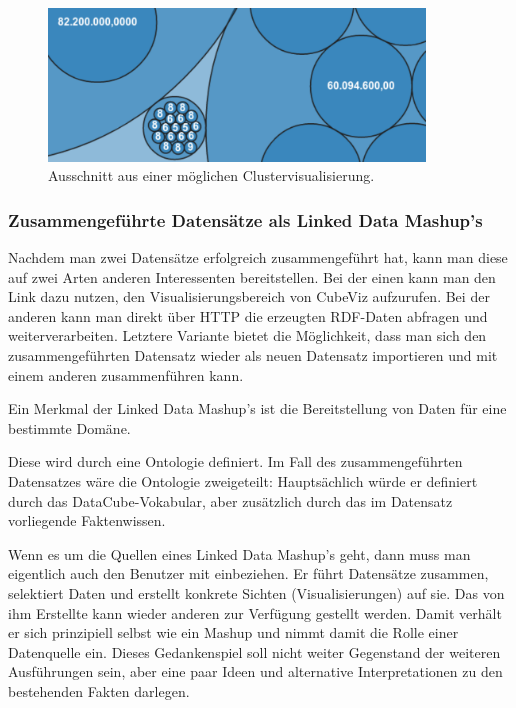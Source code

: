 \documentclass[11pt]{article}
\begin{document}
%
%
\begin{figure}[h!]
    \centering
    \includegraphics[width=10cm]{RefreshedUserInterfaces/ClusterVisualization.pdf}
    \caption{Ausschnitt aus einer möglichen Clustervisualisierung.}
    \label{fig:UserInterfaceMergeDatasets_ClusterVisualization}
\end{figure}


%
%
\subsubsection{Zusammengeführte Datensätze als Linked Data Mashup's}

Nachdem man zwei Datensätze erfolgreich zusammengeführt hat, kann man diese auf zwei Arten anderen Interessenten bereitstellen. Bei der einen kann man den Link dazu nutzen, den Visualisierungsbereich von CubeViz aufzurufen. Bei der anderen kann man direkt über HTTP die erzeugten RDF-Daten abfragen und weiterverarbeiten. Letztere Variante bietet die Möglichkeit, dass man sich den zusammengeführten Datensatz wieder als neuen Datensatz importieren und mit einem anderen zusammenführen kann.

Ein Merkmal der Linked Data Mashup's ist die Bereitstellung von Daten für eine bestimmte Domäne. 


\newpage
\noindent
Diese wird durch eine Ontologie definiert. Im Fall des zusammengeführten Datensatzes wäre die Ontologie zweigeteilt: Hauptsächlich würde er definiert durch das DataCube-Vokabular, aber zusätzlich durch das im Datensatz vorliegende Faktenwissen. 

Wenn es um die Quellen eines Linked Data Mashup's geht, dann muss man eigentlich auch den Benutzer mit einbeziehen. Er führt Datensätze zusammen, selektiert Daten und erstellt konkrete Sichten (Visualisierungen) auf sie. Das von ihm Erstellte kann wieder anderen zur Verfügung gestellt werden. Damit verhält er sich prinzipiell selbst wie ein Mashup und nimmt damit die Rolle einer Datenquelle ein. Dieses Gedankenspiel soll nicht weiter Gegenstand der weiteren Ausführungen sein, aber eine paar Ideen und alternative Interpretationen zu den bestehenden Fakten darlegen.
\end{document}
